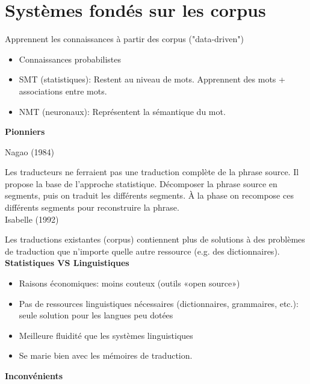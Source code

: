 \vspace{-1.2cm}

\section{Systèmes fondés sur les corpus}
\label{sec:corpus}

Apprennent les connaissances à partir des corpus ("data-driven")

\begin{itemize}
    \item Connaissances probabilistes
    \item SMT (statistiques): Restent au niveau de mots. Apprennent des mots + associations entre mots.
    \item NMT (neuronaux): Représentent la sémantique du mot.\\
\end{itemize}


\textbf{Pionniers}

Nagao (1984)

Les traducteurs ne ferraient pas une traduction complète de la phrase source. Il propose la base de l'approche statistique. Décomposer la phrase source en segments, puis on traduit les différents segments. À la phase on recompose ces différents segments pour reconstruire la phrase.\\

Isabelle (1992)

Les traductions existantes (corpus) contiennent plus de solutions à des problèmes de traduction que n'importe quelle autre ressource (e.g. des dictionnaires). \\

\textbf{Statistiques VS Linguistiques}

\begin{itemize}
    \item Raisons économiques: moins couteux (outils «open source»)
    \item Pas de ressources linguistiques nécessaires (dictionnaires, grammaires, etc.): seule solution pour les langues peu dotées
    \item Meilleure fluidité que les systèmes linguistiques
    \item Se marie bien avec les mémoires de traduction.\\
\end{itemize}

\textbf{Inconvénients}

